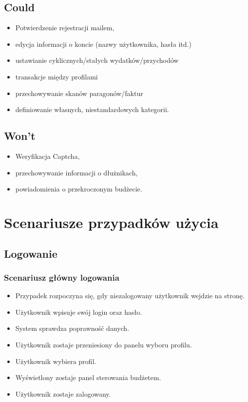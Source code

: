 \documentclass[12pt,a4paper,oneside]{article}
\begin{document}
\subsection{Could}
\begin{itemize}
    \item Potwierdzenie rejestracji mailem,
    \item edycja informacji o koncie (nazwy użytkownika, hasła itd.)
    \item ustawianie cyklicznych/stałych wydatków/przychodów
    \item transakcje między profilami
    \item przechowywanie skanów paragonów/faktur
    \item definiowanie własnych, niestandardowych kategorii.
\end{itemize}

\subsection{Won't}
\begin{itemize}
    \item Weryfikacja Captcha,
    \item przechowywanie informacji o dłużnikach,
    \item powiadomienia o przekroczonym budżecie.
\end{itemize}

\section{Scenariusze przypadków użycia}
\subsection{Logowanie}
\subsubsection{Scenariusz główny logowania}
\begin{itemize}
    \item Przypadek rozpoczyna się, gdy niezalogowany użytkownik wejdzie
          na stronę.
    \item Użytkownik wpisuje swój login oraz hasło.
    \item System sprawdza poprawność danych.
    \item Użytkownik zostaje przeniesiony do panelu wyboru profilu.
    \item Użytkownik wybiera profil.
    \item Wyświetlony zostaje panel sterowania budżetem.
    \item Użytkownik zostaje zalogowany.
\end{itemize}
\end{document}
